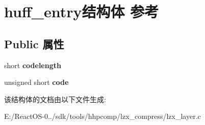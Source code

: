 \hypertarget{structhuff__entry}{}\section{huff\+\_\+entry结构体 参考}
\label{structhuff__entry}
\subsection*{Public 属性}
\begin{DoxyCompactItemize}
\item 
\mbox{\label{structhuff__entry_aa49e02a2f2085b46e3ebe70f6978e7c5}} 
short {\bfseries codelength}
\item 
\mbox{\label{structhuff__entry_a74daf73a873ea36b8d5b25a85e4bae8f}} 
unsigned short {\bfseries code}
\end{DoxyCompactItemize}


该结构体的文档由以下文件生成\+:\begin{DoxyCompactItemize}
\item 
E\+:/\+React\+O\+S-\/0../sdk/tools/hhpcomp/lzx\+\_\+compress/lzx\+\_\+layer.\+c\end{DoxyCompactItemize}
